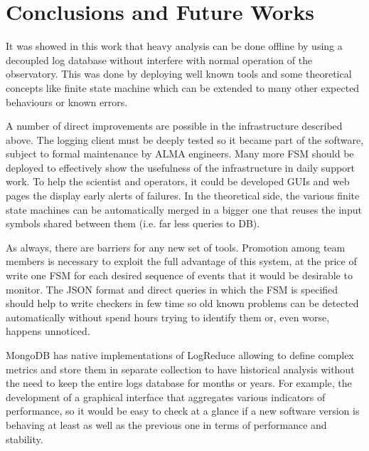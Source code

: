 \documentclass[]{spie}  %
\begin{document}
\section{Conclusions and Future Works}
It was showed in this work that heavy analysis can be done offline by using a
decoupled log database without interfere with normal operation of the
observatory. This was done by deploying well known tools and some theoretical
concepts like finite state machine which can be extended to many other expected
behaviours or known errors. 

A number of direct improvements are possible in the infrastructure described
above. The logging client must be deeply tested so it became part of the
software, subject to formal maintenance by ALMA engineers. Many more FSM should
be deployed to effectively show the usefulness of the infrastructure in daily
support work. To help the scientist and operators, it could be developed GUIs
and web pages the display early alerts of failures. In the theoretical side,
    the various finite state machines can be automatically merged in a bigger
    one that reuses the input symbols shared between them (i.e. far less
            queries to DB). 

As always, there are barriers for any new set of tools. Promotion among team
members is necessary to exploit the full advantage of this system, at the price
of write one FSM for each desired sequence of events that it would be desirable
to monitor. The JSON format and direct queries in which the FSM is specified
should help to write checkers in few time so old known problems can be detected
automatically without spend hours trying to identify them or, even worse,
              happens unnoticed.

MongoDB has native implementations of LogReduce allowing to define complex
metrics and store them in separate collection to have historical analysis
without the need to keep the entire logs database for months or years. For
example, the development of a graphical interface that aggregates various
indicators of performance, so it would be easy to check at a glance if a new
software version is behaving at least as well as the previous one in terms of
performance and stability.
 
\end{document}
